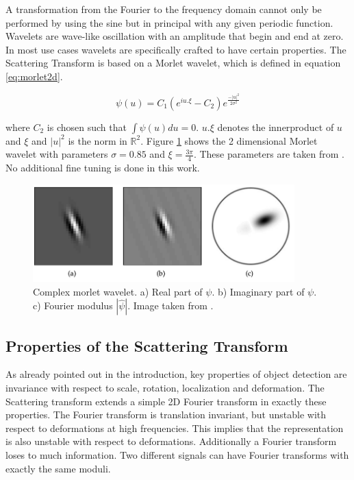 A transformation from the Fourier to the frequency domain cannot only be performed by using the sine but in principal with any given periodic function.
Wavelets are wave-like oscillation with an amplitude that begin and end at zero. In most use cases wavelets are specifically crafted to have certain properties. 
The Scattering Transform is based on a Morlet wavelet, which is defined in equation \ref{eq:morlet2d}.

\begin{equation}
	\psi(u) = C_1 (e^{iu.\xi} - C_2) e^{\frac{-|u|^2}{2\sigma^2}}
\end{equation}


where $C_2$ is chosen such that $\int \psi(u) du = 0$. $u.\xi$ denotes the innerproduct of $u$ and $\xi$ and $|u|^2$ is the norm in $\mathbb{R}^2$. 
Figure \ref{fig:morlet2d} shows the 2 dimensional Morlet wavelet with parameters $\sigma = 0.85$ and $\xi = \frac{3\pi}{4}$. These parameters are taken from \cite{scatteringTransform2012}. No additional fine tuning is done in this work. 

\begin{figure}[!htb]
	\centering
	\includegraphics[width = 0.9\textwidth]{images/morlet2d.png}
	\caption{Complex morlet wavelet. a) Real part of $\psi$. b) Imaginary part of $\psi$. c) Fourier modulus $|\hat{\psi}|$. Image taken from \cite{scatteringTransform2012}.}
	\label{fig:morlet2d}
\end{figure}

\subsection{Properties of the Scattering Transform}


As already pointed out in the introduction, key properties of object detection are invariance with respect to scale, rotation, localization and deformation. The Scattering transform extends a simple 2D Fourier transform in exactly these properties. The Fourier transform is translation invariant, but unstable with respect to deformations at high frequencies. This implies that the representation is also unstable with respect to deformations.
Additionally a Fourier transform loses to much information. Two different signals can have Fourier transforms with exactly the same moduli. \\


